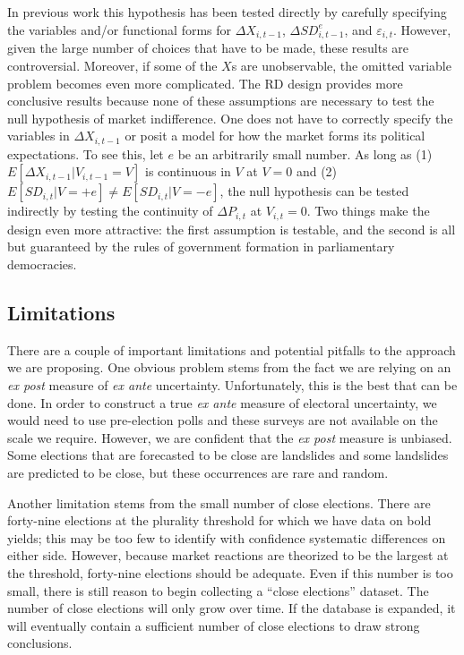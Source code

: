 \documentclass[12pt]{article}
\begin{document}
In previous work this hypothesis has been tested directly by carefully specifying the variables and/or functional forms for $\Delta X_{i,t-1}$, $\Delta SD^e_{i,t-1}$, and $\varepsilon_{i,t}$. However, given the large number of choices that have to be made, these results are controversial. Moreover, if some of the $X$s are unobservable, the omitted variable problem becomes even more complicated. The RD design provides more conclusive results because none of these assumptions are necessary to test the null hypothesis of market indifference. One does not have to correctly specify the variables in $\Delta X_{i,t-1}$ or posit a model for how the market forms its political expectations. To see this, let $e$ be an arbitrarily small number. As long as (1) $E\left[\Delta X_{i,t-1} | V_{i,t-1} = V\right]$ is continuous in $V$ at $V=0$ and (2) $E\left[SD_{i,t}|V = +e\right] \neq E\left[SD_{i,t}|V = -e\right]$, the null hypothesis can be tested indirectly by testing the continuity of $\Delta P_{i,t}$ at $V_{i,t} = 0$. Two things make the design even more attractive: the first assumption is testable, and the second is all but guaranteed by the rules of government formation in parliamentary democracies. 


\subsection{Limitations}

There are a couple of important limitations and potential pitfalls to the approach we are proposing. One obvious problem stems from the fact we are relying on an \textit{ex post} measure of \textit{ex ante} uncertainty. Unfortunately, this is the best that can be done. In order to construct a true \textit{ex ante} measure of electoral uncertainty, we would need to use pre-election polls and these surveys are not available on the scale we require. However, we are confident that the \textit{ex post} measure is unbiased. Some elections that are forecasted to be close are landslides and some landslides are predicted to be close, but these occurrences are rare and random.

Another limitation stems from the small number of close elections. There are forty-nine elections at the plurality threshold for which we have data on bold yields; this may be too few to identify with confidence systematic differences on either side. However, because market reactions are theorized to be the largest at the threshold, forty-nine elections should be adequate. Even if this number is too small, there is still reason to begin collecting a ``close elections'' dataset. The number of close elections will only grow over time. If the database is expanded, it will eventually contain a sufficient number of close elections to draw strong conclusions. 
\end{document}

